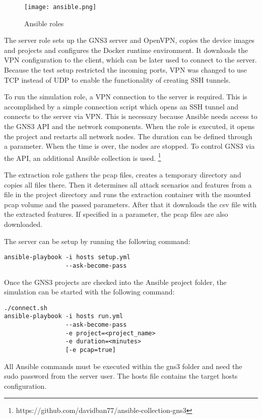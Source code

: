 \documentclass[conference]{IEEEtran}
\begin{document}
\begin{figure}[htbp]
\centerline{\texttt{[image: ansible.png]}}
\caption{Ansible roles}
\label{ansible}
\end{figure}

The server role sets up the GNS3 server and OpenVPN, copies the device images and projects and configures the Docker runtime environment. It downloads the VPN configuration to the client, which can be later used to connect to the server. Because the test setup restricted the incoming ports, VPN was changed to use TCP instead of UDP to enable the functionality of creating SSH tunnels.

To run the simulation role, a VPN connection to the server is required. This is accomplished by a simple connection script which opens an SSH tunnel and connects to the server via VPN. This is necessary because Ansible needs access to the GNS3 API and the network components. When the role is executed, it opens the project and restarts all network nodes. The duration can be defined through a parameter. When the time is over, the nodes are stopped. To control GNS3 via the API, an additional Ansible collection is used. \footnote{https://github.com/davidban77/ansible-collection-gns3}

The extraction role gathers the pcap files, creates a temporary directory and copies all files there. Then it determines all attack scenarios and features from a file in the project directory and runs the extraction container with the mounted pcap volume and the passed parameters. After that it downloads the csv file with the extracted features. If specified in a parameter, the pcap files are also downloaded.

The server can be setup by running the following command:
\begin{verbatim}
ansible-playbook -i hosts setup.yml 
                 --ask-become-pass
\end{verbatim}

\newpage

Once the GNS3 projects are checked into the Ansible project folder, the simulation can be started with the following command:
\begin{verbatim}
./connect.sh
ansible-playbook -i hosts run.yml
                 --ask-become-pass
                 -e project=<project_name>
                 -e duration=<minutes>
                 [-e pcap=true]
\end{verbatim}

All Ansible commands must be executed within the gns3 folder and need the sudo password from the server user. The hosts file contains the target hosts configuration.
\end{document}
